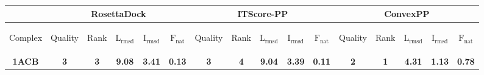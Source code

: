 
\begin{longtable}{c c c c c c|c c c c c|c c c c c}
& 
\multicolumn{5}{c}{RosettaDock} &
\multicolumn{5}{c}{ITScore-PP} &
\multicolumn{5}{c}{ConvexPP} \\
\hline
\begin{sideways}{Complex}\end{sideways}&\begin{sideways}{Quality}\end{sideways}&\begin{sideways}{Rank}\end{sideways}&\begin{sideways}$\mathrm{L_{rmsd}}$\end{sideways}&\begin{sideways}$\mathrm{I_{rmsd}}$\end{sideways}&\begin{sideways}$\mathrm{F_{nat}}$\end{sideways}&\begin{sideways}{Quality}\end{sideways}&\begin{sideways}{Rank}\end{sideways}&\begin{sideways}$\mathrm{L_{rmsd}}$\end{sideways}&\begin{sideways}$\mathrm{I_{rmsd}}$\end{sideways}&\begin{sideways}$\mathrm{F_{nat}}$\end{sideways}&\begin{sideways}{Quality}\end{sideways}&\begin{sideways}{Rank}\end{sideways}&\begin{sideways}$\mathrm{L_{rmsd}}$\end{sideways}&\begin{sideways}$\mathrm{I_{rmsd}}$\end{sideways}&\begin{sideways}$\mathrm{F_{nat}}$\end{sideways}\\ 
 \hline
\textbf{\tiny 1ACB}&\textbf{\tiny 3}&\textbf{\tiny 3}&\textbf{\tiny 9.08}&\textbf{\tiny 3.41}&\textbf{\tiny 0.13}&\textbf{\tiny 3}&\textbf{\tiny 4}&\textbf{\tiny 9.04}&\textbf{\tiny 3.39}&\textbf{\tiny 0.11}&\textbf{\tiny 2}&\textbf{\tiny 1}&\textbf{\tiny 4.31}&\textbf{\tiny 1.13}&\textbf{\tiny 0.78}\\ 

\end{longtable}
